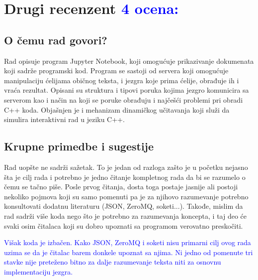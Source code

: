 \documentclass[a4paper]{report}
\newcommand{\odgovor}[1]{\textcolor{blue}{#1}}
\begin{document}
\chapter{Drugi recenzent \odgovor{4 ocena:} }


\section{O čemu rad govori?}
Rad opisuje program Jupyter Notebook, koji omogućuje prikazivanje dokumenata koji sadrže programski kod. Program se sastoji od servera koji omogućuje manipulaciju ćelijama običnog teksta, i jezgra koje prima ćelije, obrađuje ih i vraća rezultat. Opisani su struktura i tipovi poruka kojima jezgro komunicira sa serverom kao i način na koji se poruke obrađuju i najčešći problemi pri obradi C++ koda. Objašnjen je i mehanizam dinamičkog učitavanja koji služi da simulira interaktivni rad u jeziku C++.

\section{Krupne primedbe i sugestije}
Rad uopšte ne sadrži sažetak. To je jedan od razloga zašto je u početku nejasno šta je cilj rada i potrebno je jedno čitanje kompletnog rada da bi se razumelo o čemu se tačno piše. Posle prvog čitanja, dosta toga postaje jasnije ali postoji nekoliko pojmova koji su samo pomenuti pa je za njihovo razumevanje potrebno konsultovati dodatnu literaturu (JSON, ZeroMQ, soketi...). Takođe, mislim da rad sadrži više koda nego što je potrebno za razumevanja koncepta, i taj deo će svaki osim čitalaca koji su dobro upoznati sa programom verovatno preskočiti.

\odgovor{
  Višak koda je izbačen. Kako JSON, ZeroMQ i soketi nisu primarni cilj ovog rada uzima se da je čitalac barem donkele upoznat sa njima. Ni jedno od pomenute
  tri stavke nije preteženo bitno za dalje razumevanje teksta niti za osnovnu implementaciju jezgra.
}
\end{document}
